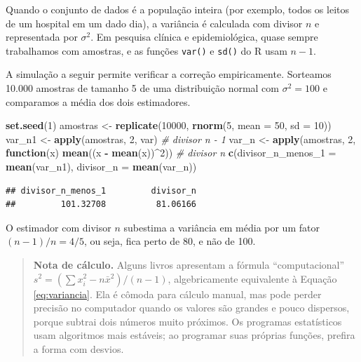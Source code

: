 \documentclass[
]{book}
\newenvironment{Shaded}{\begin{snugshade}}{\end{snugshade}}
\newcommand{\AttributeTok}[1]{\textcolor[rgb]{0.13,0.29,0.53}{#1}}
\newcommand{\CommentTok}[1]{\textcolor[rgb]{0.56,0.35,0.01}{\textit{#1}}}
\newcommand{\ControlFlowTok}[1]{\textcolor[rgb]{0.13,0.29,0.53}{\textbf{#1}}}
\newcommand{\DecValTok}[1]{\textcolor[rgb]{0.00,0.00,0.81}{#1}}
\newcommand{\FunctionTok}[1]{\textcolor[rgb]{0.13,0.29,0.53}{\textbf{#1}}}
\newcommand{\NormalTok}[1]{#1}
\newcommand{\OtherTok}[1]{\textcolor[rgb]{0.56,0.35,0.01}{#1}}
\newcommand{\SpecialCharTok}[1]{\textcolor[rgb]{0.81,0.36,0.00}{\textbf{#1}}}
\begin{document}
Quando o conjunto de dados é a população inteira (por exemplo, todos os leitos de um hospital em um dado dia), a variância é calculada com divisor \(n\) e representada por \(\sigma^2\). Em pesquisa clínica e epidemiológica, quase sempre trabalhamos com amostras, e as funções \texttt{var()} e \texttt{sd()} do R usam \(n - 1\).

A simulação a seguir permite verificar a correção empiricamente. Sorteamos 10.000 amostras de tamanho 5 de uma distribuição normal com \(\sigma^2 = 100\) e comparamos a média dos dois estimadores.

\begin{Shaded}
\begin{Highlighting}[]
\FunctionTok{set.seed}\NormalTok{(}\DecValTok{1}\NormalTok{)}
\NormalTok{amostras }\OtherTok{\textless{}{-}} \FunctionTok{replicate}\NormalTok{(}\DecValTok{10000}\NormalTok{, }\FunctionTok{rnorm}\NormalTok{(}\DecValTok{5}\NormalTok{, }\AttributeTok{mean =} \DecValTok{50}\NormalTok{, }\AttributeTok{sd =} \DecValTok{10}\NormalTok{))}
\NormalTok{var\_n1 }\OtherTok{\textless{}{-}} \FunctionTok{apply}\NormalTok{(amostras, }\DecValTok{2}\NormalTok{, var)                         }\CommentTok{\# divisor n {-} 1}
\NormalTok{var\_n  }\OtherTok{\textless{}{-}} \FunctionTok{apply}\NormalTok{(amostras, }\DecValTok{2}\NormalTok{, }\ControlFlowTok{function}\NormalTok{(x) }\FunctionTok{mean}\NormalTok{((x }\SpecialCharTok{{-}} \FunctionTok{mean}\NormalTok{(x))}\SpecialCharTok{\^{}}\DecValTok{2}\NormalTok{))  }\CommentTok{\# divisor n}
\FunctionTok{c}\NormalTok{(}\AttributeTok{divisor\_n\_menos\_1 =} \FunctionTok{mean}\NormalTok{(var\_n1), }\AttributeTok{divisor\_n =} \FunctionTok{mean}\NormalTok{(var\_n))}
\end{Highlighting}
\end{Shaded}

\begin{verbatim}
## divisor_n_menos_1         divisor_n 
##         101.32708          81.06166
\end{verbatim}

O estimador com divisor \(n\) subestima a variância em média por um fator \((n-1)/n = 4/5\), ou seja, fica perto de 80, e não de 100.

\begin{quote}
\textbf{Nota de cálculo.} Alguns livros apresentam a fórmula ``computacional'' \(s^2 = \left(\sum x_i^2 - n\bar{x}^2\right)/(n-1)\), algebricamente equivalente à Equação \eqref{eq:variancia}. Ela é cômoda para cálculo manual, mas pode perder precisão no computador quando os valores são grandes e pouco dispersos, porque subtrai dois números muito próximos. Os programas estatísticos usam algoritmos mais estáveis; ao programar suas próprias funções, prefira a forma com desvios.
\end{quote}
\end{document}
